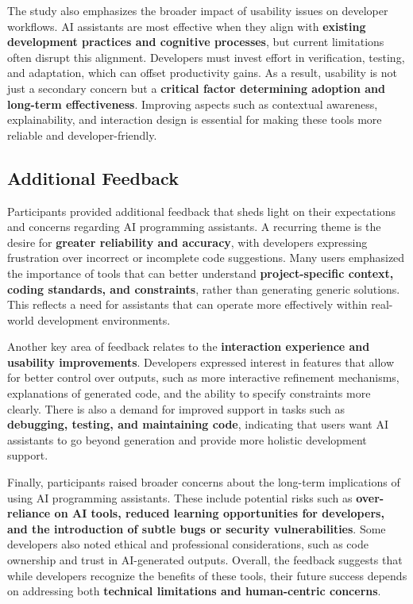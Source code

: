 The study also emphasizes the broader impact of usability issues on developer workflows. AI assistants are most effective when they align with \textbf{existing development practices and cognitive processes}, but current limitations often disrupt this alignment. Developers must invest effort in verification, testing, and adaptation, which can offset productivity gains. As a result, usability is not just a secondary concern but a \textbf{critical factor determining adoption and long-term effectiveness}. Improving aspects such as contextual awareness, explainability, and interaction design is essential for making these tools more reliable and developer-friendly.

\subsection{Additional Feedback}
Participants provided additional feedback that sheds light on their expectations and concerns regarding AI programming assistants. A recurring theme is the desire for \textbf{greater reliability and accuracy}, with developers expressing frustration over incorrect or incomplete code suggestions. Many users emphasized the importance of tools that can better understand \textbf{project-specific context, coding standards, and constraints}, rather than generating generic solutions. This reflects a need for assistants that can operate more effectively within real-world development environments.

Another key area of feedback relates to the \textbf{interaction experience and usability improvements}. Developers expressed interest in features that allow for better control over outputs, such as more interactive refinement mechanisms, explanations of generated code, and the ability to specify constraints more clearly. There is also a demand for improved support in tasks such as \textbf{debugging, testing, and maintaining code}, indicating that users want AI assistants to go beyond generation and provide more holistic development support.

Finally, participants raised broader concerns about the long-term implications of using AI programming assistants. These include potential risks such as \textbf{over-reliance on AI tools, reduced learning opportunities for developers, and the introduction of subtle bugs or security vulnerabilities}. Some developers also noted ethical and professional considerations, such as code ownership and trust in AI-generated outputs. Overall, the feedback suggests that while developers recognize the benefits of these tools, their future success depends on addressing both \textbf{technical limitations and human-centric concerns}.

